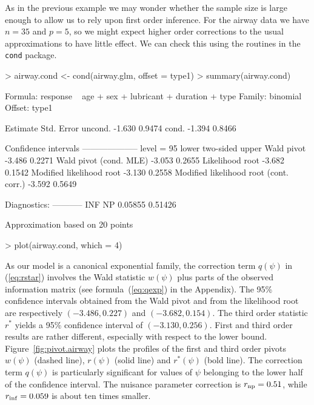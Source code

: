 \documentclass[a4paper,11pt]{article}
\def\code{\texttt}
\begin{document}
As in the previous example we may wonder whether the sample size is large enough to allow us to rely upon first order inference.  For the airway data we have $n=35$ and $p=5$, so we might expect higher order corrections to the usual approximations to have little effect.  We can check this using the routines in the \code{cond} package.
%
\begin{Schunk}
\begin{Sinput}
> airway.cond <- cond(airway.glm, offset = type1)
> summary(airway.cond)
\end{Sinput}
\begin{Soutput}
 Formula:  response ~ age + sex + lubricant + duration + type
 Family:  binomial
 Offset:  type1

          Estimate   Std. Error 
uncond.      -1.630       0.9474
cond.        -1.394       0.8466

Confidence intervals
--------------------
 level = 95 %
                                         lower two-sided  upper
Wald pivot                              -3.486           0.2271
Wald pivot (cond. MLE)                  -3.053           0.2655
Likelihood root                         -3.682           0.1542
Modified likelihood root                -3.130           0.2558
Modified likelihood root (cont. corr.)  -3.592           0.5649

Diagnostics:
----------- 
    INF      NP 
0.05855 0.51426 

 Approximation based on 20 points
\end{Soutput}
\begin{Sinput}
> plot(airway.cond, which = 4)
\end{Sinput}
\end{Schunk}
%
As our model is a canonical exponential family, the correction term $q(\psi)$ in (\ref{eq:rstar}) involves the Wald statistic $w(\psi)$ plus parts of the observed information matrix (see formula~(\ref{eq:qexp}) in the Appendix).  The 95\% confidence intervals obtained from the Wald pivot and from the likelihood root are respectively $(-3.486, 0.227)$ and $(-3.682,  0.154)$.  The third order statistic $r^*$ yields a 95\% confidence interval of $(-3.130, 0.256)$.  First and third order results are rather different, especially with respect to the lower bound.  Figure~\ref{fig:pivot.airway} plots the profiles of the first and third order pivots $w(\psi)$ (dashed line), $r(\psi)$ (solid line) and $r^*(\psi)$ (bold line).  The correction term $q(\psi)$ is particularly significant for values of $\psi$ belonging to the lower half of the confidence interval.  The nuisance parameter correction is $r_{\rm np}=0.51$, while $r_{\rm inf}=0.059$
is about ten times smaller.
\end{document}
